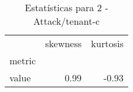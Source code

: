 \begin{table}[htbp]
\caption{Estatísticas para 2 - Attack/tenant-c}
\label{tab:2_-_attack_tenant-c_skewkurt}
\begin{tabular}{lrr}
\toprule
 & skewness & kurtosis \\
metric &  &  \\
\midrule
value & 0.99 & -0.93 \\
\bottomrule
\end{tabular}
\end{table}
